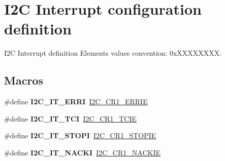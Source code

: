 \hypertarget{group___i2_c___interrupt__configuration__definition}{}\section{I2C Interrupt configuration definition}
\label{group___i2_c___interrupt__configuration__definition}


I2C Interrupt definition Elements values convention\+: 0x\+X\+X\+X\+X\+X\+X\+XX.  


\subsection*{Macros}
\begin{DoxyCompactItemize}
\item 
\mbox{\label{group___i2_c___interrupt__configuration__definition_gaef52e00037d5a51adf3f3a97aefcbdda}} 
\#define {\bfseries I2\+C\+\_\+\+I\+T\+\_\+\+E\+R\+RI}~\hyperlink{group___peripheral___registers___bits___definition_ga75e971012a02f9dad47a1629c6f5d956}{I2\+C\+\_\+\+C\+R1\+\_\+\+E\+R\+R\+IE}
\item 
\mbox{\label{group___i2_c___interrupt__configuration__definition_ga6e848112accf2d034e979e65710b2f0f}} 
\#define {\bfseries I2\+C\+\_\+\+I\+T\+\_\+\+T\+CI}~\hyperlink{group___peripheral___registers___bits___definition_ga6b37e64bdf6399ef12c3df77bcb1634f}{I2\+C\+\_\+\+C\+R1\+\_\+\+T\+C\+IE}
\item 
\mbox{\label{group___i2_c___interrupt__configuration__definition_ga0a85b2740a7d8669dfeacdc81ef0692b}} 
\#define {\bfseries I2\+C\+\_\+\+I\+T\+\_\+\+S\+T\+O\+PI}~\hyperlink{group___peripheral___registers___bits___definition_ga1f1576cb1a2cd847f55fe2a0820bb166}{I2\+C\+\_\+\+C\+R1\+\_\+\+S\+T\+O\+P\+IE}
\item 
\mbox{\label{group___i2_c___interrupt__configuration__definition_gaf64fb93453bfbae36de26ff1465029f0}} 
\#define {\bfseries I2\+C\+\_\+\+I\+T\+\_\+\+N\+A\+C\+KI}~\hyperlink{group___peripheral___registers___bits___definition_gae3f71f7a55e13a467b2a5ed639e0fe18}{I2\+C\+\_\+\+C\+R1\+\_\+\+N\+A\+C\+K\+IE}

\end{DoxyCompactItemize}
